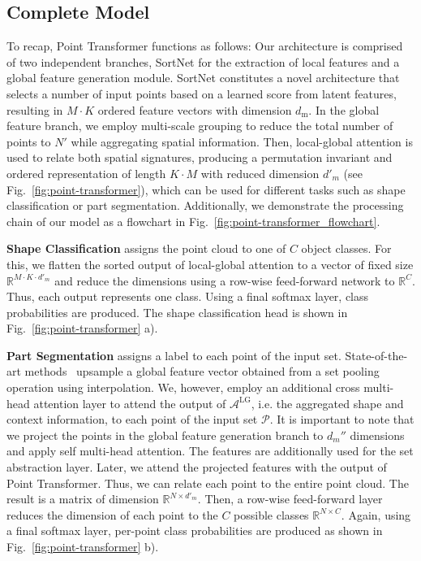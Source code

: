 \documentclass{ieeeaccess}
\begin{document}
\subsection{Complete Model}
To recap, Point Transformer functions as follows: Our architecture is comprised of two independent branches, SortNet for the extraction of local features and a global feature generation module. SortNet constitutes a novel architecture that selects a number of input points based on a learned score from latent features, resulting in $M \cdot K$ ordered feature vectors with dimension $d_{\text{m}}$. In the global feature branch, we employ multi-scale grouping to reduce the total number of points to $N'$ while aggregating spatial information. Then, local-global attention is used to relate both spatial signatures, producing a permutation invariant and ordered representation of length $K \cdot M$ with reduced dimension $d'_m$ (see Fig.~\ref{fig:point-transformer}), which can be used for different tasks such as shape classification or part segmentation. Additionally, we demonstrate the processing chain of our model as a flowchart in Fig.~\ref{fig:point-transformer_flowchart}.

\textbf{Shape Classification} assigns the point cloud to one of $C$ object classes. For this, we flatten the sorted output of local-global attention to a vector of fixed size $\mathbb{R}^{M\cdot K \cdot d'_m}$ and reduce the dimensions using a row-wise feed-forward network to $\mathbb{R}^C$. Thus, each output represents one class. Using a final softmax layer, class probabilities are produced. The shape classification head is shown in Fig.~\ref{fig:point-transformer} a). 

\textbf{Part Segmentation} assigns a label to each point of the input set. State-of-the-art methods~\cite{qi2017pointnet++,liu2019point2sequence} upsample a global feature vector obtained from a set pooling operation using interpolation. We, however, employ an additional cross multi-head attention layer to attend the output of $\mathcal{A}^{\text{LG}}$, i.e. the aggregated shape and context information, to each point of the input set $\mathcal{P}$. 
It is important to note that we project the points in the global feature generation branch to $d_m''$ dimensions and apply self multi-head attention. The features are additionally used for the set abstraction layer. Later, we attend the projected features with the output of Point Transformer. Thus, we can relate each point to the entire point cloud.
The result is a matrix of dimension $\mathbb{R}^{N \times d'_{m}}$. Then, a row-wise feed-forward layer reduces the dimension of each point to the $C$ possible classes $\mathbb{R}^{N\times C}$. Again, using a final softmax layer, per-point class probabilities are produced as shown in Fig.~\ref{fig:point-transformer} b). 
\end{document}
